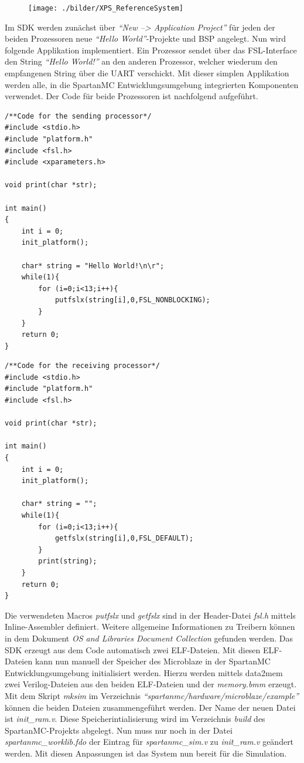 \begin{figure}[th!]
	\centering
	\texttt{[image: ./bilder/XPS\_ReferenceSystem]}
	\caption{}
	\label{fig:XPS_ReferenceSystem}
\end{figure}
\noindent
Im SDK werden zunächst über \textit{``New --> Application Project''} für jeden der beiden Prozessoren neue \textit{``Hello World''}-Projekte und BSP angelegt. Nun wird folgende Applikation implementiert. Ein Prozessor sendet über das FSL-Interface den String \textit{``Hello World!''} an den anderen Prozessor, welcher wiederum den empfangenen String über die UART verschickt. Mit dieser simplen Applikation werden alle, in die SpartanMC Entwicklungsumgebung integrierten Komponenten verwendet. Der Code für beide Prozessoren ist nachfolgend aufgeführt.
\begin{lstlisting}
/**Code for the sending processor*/
#include <stdio.h>
#include "platform.h"
#include <fsl.h>
#include <xparameters.h>

void print(char *str);

int main()
{
	int i = 0;
    init_platform();

    char* string = "Hello World!\n\r";
    while(1){
    	for (i=0;i<13;i++){
			putfslx(string[i],0,FSL_NONBLOCKING);
		}
    }
    return 0;
}
\end{lstlisting}
\begin{lstlisting}
/**Code for the receiving processor*/
#include <stdio.h>
#include "platform.h"
#include <fsl.h>

void print(char *str);

int main()
{
	int i = 0;
    init_platform();

    char* string = "";
    while(1){
		for (i=0;i<13;i++){
			getfslx(string[i],0,FSL_DEFAULT);
		}
		print(string);
    }
    return 0;
}
\end{lstlisting}
\noindent
Die verwendeten Macros \textit{putfslx} und \textit{getfslx} sind in der Header-Datei \textit{fsl.h} mittels Inline-Assembler definiert. Weitere allgemeine Informationen zu Treibern können in dem Dokument \textit{OS and Libraries Document Collection} \cite{OSLIB} gefunden werden. Das SDK erzeugt aus dem Code automatisch zwei ELF-Dateien. Mit diesen ELF-Dateien kann nun manuell der Speicher des Microblaze in der SpartanMC Entwicklungsumgebung initialisiert werden. Hierzu werden mittels data2mem zwei Verilog-Dateien aus den beiden ELF-Dateien und der \textit{memory.bmm} erzeugt. Mit dem Skript \textit{mksim} im Verzeichnis \textit{``spartanmc/hardware/microblaze/example''} können die beiden Dateien zusammengeführt werden. Der Name der neuen Datei ist \textit{init\_ram.v}. Diese Speicherintialisierung wird im Verzeichnis \textit{build} des SpartanMC-Projekts abgelegt. Nun muss nur noch in der Datei \textit{spartanmc\_worklib.fdo} der Eintrag für \textit{spartanmc\_sim.v} zu \textit{init\_ram.v} geändert werden. Mit diesen Anpassungen ist das System nun bereit für die Simulation.


